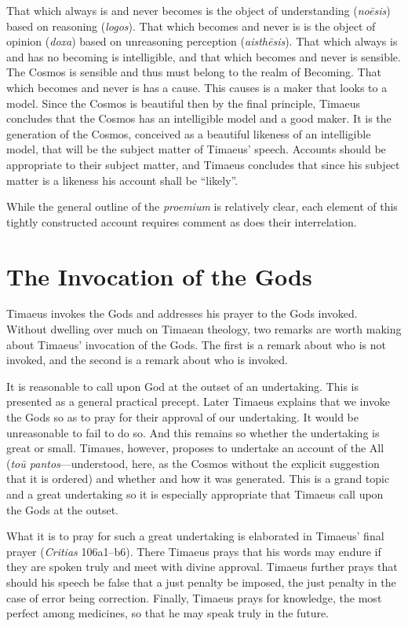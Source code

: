 That which always is and never becomes is the object of understanding (\emph{noēsis}) based on reasoning (\emph{logos}). That which becomes and never is is the object of opinion (\emph{doxa}) based on unreasoning perception (\emph{aisthēsis}). That which always is and has no becoming is intelligible, and that which becomes and never is sensible. The Cosmos is sensible and thus must belong to the realm of Becoming. That which becomes and never is has a cause. This causes is a maker that looks to a model. Since the Cosmos is beautiful then by the final principle, Timaeus concludes that the Cosmos has an intelligible model and a good maker. It is the generation of the Cosmos, conceived as a beautiful likeness of an intelligible model, that will be the subject matter of Timaeus' speech. Accounts should be appropriate to their subject matter, and Timaeus concludes that since his subject matter is a likeness his account shall be ``likely''.

While the general outline of the \emph{proemium} is relatively clear, each element of this tightly constructed account requires comment as does their interrelation. 


\section{The Invocation of the Gods} %
\label{sec:the_invocation_of_the_gods}

Timaeus invokes the Gods and addresses his prayer to the Gods invoked. Without dwelling over much on Timaean theology, two remarks are worth making about Timaeus' invocation of the Gods. The first is a remark about who is not invoked, and the second is a remark about who is invoked.

It is reasonable to call upon God at the outset of an undertaking. This is presented as a general practical precept. Later Timaeus explains that we invoke the Gods so as to pray for their approval of our undertaking. It would be unreasonable to fail to do so. And this remains so whether the undertaking is great or small. Timaues, however, proposes to undertake an account of the All (\emph{toū pantos}---understood, here, as the Cosmos without the explicit suggestion that it is ordered) and whether and how it was generated. This is a grand topic and a great undertaking so it is especially appropriate that Timaeus call upon the Gods at the outset.

What it is to pray for such a great undertaking is elaborated in Timaeus' final prayer (\emph{Critias} 106a1–b6). There Timaeus prays that his words may endure if they are spoken truly and meet with divine approval. Timaeus further prays that should his speech be false that a just penalty be imposed, the just penalty in the case of error being correction. Finally, Timaeus prays for knowledge, the most perfect among medicines, so that he may speak truly in the future.


